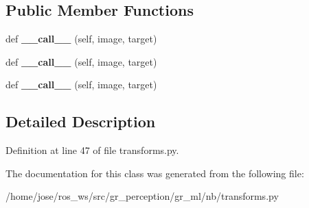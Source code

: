 \subsection*{Public Member Functions}
\begin{DoxyCompactItemize}
\item 
\mbox{\label{classtransforms_1_1ToTensor_ac92a50cad46dda903face3594b458b5d}} 
def {\bfseries \+\_\+\+\_\+call\+\_\+\+\_\+} (self, image, target)
\item 
\mbox{\label{classtransforms_1_1ToTensor_ac92a50cad46dda903face3594b458b5d}} 
def {\bfseries \+\_\+\+\_\+call\+\_\+\+\_\+} (self, image, target)
\item 
\mbox{\label{classtransforms_1_1ToTensor_ac92a50cad46dda903face3594b458b5d}} 
def {\bfseries \+\_\+\+\_\+call\+\_\+\+\_\+} (self, image, target)
\end{DoxyCompactItemize}


\subsection{Detailed Description}


Definition at line 47 of file transforms.\+py.



The documentation for this class was generated from the following file\+:\begin{DoxyCompactItemize}
\item 
/home/jose/ros\+\_\+ws/src/gr\+\_\+perception/gr\+\_\+ml/nb/transforms.\+py\end{DoxyCompactItemize}
